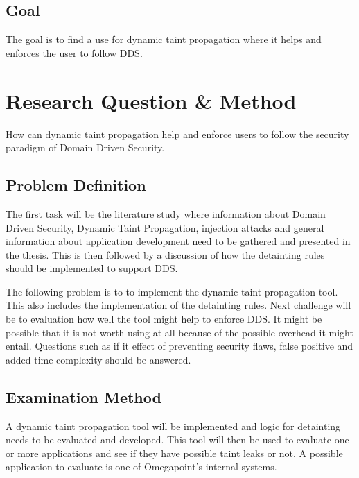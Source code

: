 \documentclass{../kththesis}
\begin{document}
\section{Goal}
The goal is to find a use for dynamic taint propagation where it helps and enforces the user to follow DDS. 



\chapter{Research Question \& Method}
How can dynamic taint propagation help and enforce users to follow the security paradigm of Domain Driven Security.


\section{Problem Definition}
The first task will be the literature study where information about Domain Driven Security, Dynamic Taint Propagation, injection attacks and general information about application development need to be gathered and presented in the thesis. This is then followed by a discussion of how the detainting rules should be implemented to support DDS. 

The following problem is to to implement the dynamic taint propagation tool. This also includes the implementation of the detainting rules. Next challenge will be to evaluation how well the tool might help to enforce DDS. It might be possible that it is not worth using at all because of the possible overhead it might entail. Questions such as if it effect of preventing security flaws, false positive and added time complexity should be answered.


\section{Examination Method}
A dynamic taint propagation tool will be implemented and logic for detainting needs to be evaluated and developed. This tool will then be used to evaluate one or more applications and see if they have possible taint leaks or not. A possible application to evaluate is one of Omegapoint's internal systems.
\end{document}
